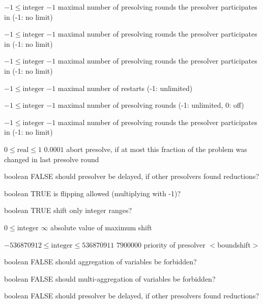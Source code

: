 %
{$-1\leq\textrm{integer}$}%
{$-1$}%
{maximal number of presolving rounds the presolver participates in (-1: no limit)}%
{}

%
{$-1\leq\textrm{integer}$}%
{$-1$}%
{maximal number of presolving rounds the presolver participates in (-1: no limit)}%
{}

%
{$-1\leq\textrm{integer}$}%
{$-1$}%
{maximal number of presolving rounds the presolver participates in (-1: no limit)}%
{}

%
{$-1\leq\textrm{integer}$}%
{$-1$}%
{maximal number of restarts (-1: unlimited)}%
{}

%
{$-1\leq\textrm{integer}$}%
{$-1$}%
{maximal number of presolving rounds (-1: unlimited, 0: off)}%
{}

%
{$-1\leq\textrm{integer}$}%
{$-1$}%
{maximal number of presolving rounds the presolver participates in (-1: no limit)}%
{}

%
{$0\leq\textrm{real}\leq1$}%
{$0.0001$}%
{abort presolve, if at most this fraction of the problem was changed in last presolve round}%
{}

%
{boolean}%
{FALSE}%
{should presolver be delayed, if other presolvers found reductions?}%
{}

%
{boolean}%
{TRUE}%
{is flipping allowed (multiplying with -1)?}%
{}

%
{boolean}%
{TRUE}%
{shift only integer ranges?}%
{}

%
{$0\leq\textrm{integer}$}%
{$\infty$}%
{absolute value of maximum shift}%
{}

%
{$-536870912\leq\textrm{integer}\leq536870911$}%
{$7900000$}%
{priority of presolver $<$boundshift$>$}%
{}

%
{boolean}%
{FALSE}%
{should aggregation of variables be forbidden?}%
{}

%
{boolean}%
{FALSE}%
{should multi-aggregation of variables be forbidden?}%
{}

%
{boolean}%
{FALSE}%
{should presolver be delayed, if other presolvers found reductions?}%
{}

